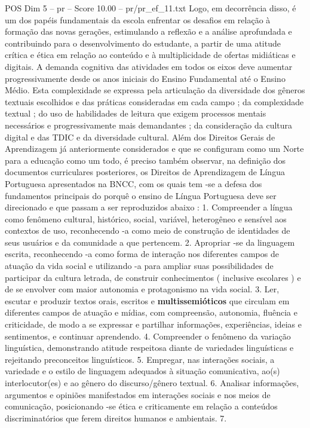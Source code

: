 \begin{textsample}{POS Dim 5 – pr – Score 10.00 – pr/pr\_ef\_11.txt}
Logo, em decorrência disso, é um dos papéis fundamentais da escola enfrentar os desafios em relação à formação das novas gerações, estimulando a reflexão e a análise aprofundada e contribuindo para o desenvolvimento do estudante, a partir de uma atitude crítica e ética em relação ao conteúdo e à multiplicidade de ofertas midiáticas e digitais.
A demanda cognitiva das atividades em todos os eixos deve aumentar progressivamente desde os anos iniciais do Ensino Fundamental até o Ensino Médio.
Esta complexidade se expressa pela articulação da diversidade dos gêneros textuais escolhidos e das práticas consideradas em cada campo ; da complexidade textual ; do uso de habilidades de leitura que exigem processos mentais necessários e progressivamente mais demandantes ; da consideração da cultura digital e das TDIC e da diversidade cultural.
Além dos Direitos Gerais de Aprendizagem já anteriormente considerados e que se configuram como um Norte para a educação como um todo, é preciso também observar, na definição dos documentos curriculares posteriores, os Direitos de Aprendizagem de Língua Portuguesa apresentados na BNCC, com os quais tem -se a defesa dos fundamentos principais do porquê o ensino de Língua Portuguesa deve ser direcionado e que passam a ser reproduzidos abaixo : 1.
Compreender a língua como fenômeno cultural, histórico, social, variável, heterogêneo e sensível aos contextos de uso, reconhecendo -a como meio de construção de identidades de seus usuários e da comunidade a que pertencem. 2.
Apropriar -se da linguagem escrita, reconhecendo -a como forma de interação nos diferentes campos de atuação da vida social e utilizando -a para ampliar suas possibilidades de participar da cultura letrada, de construir conhecimentos ( inclusive escolares ) e de se envolver com maior autonomia e protagonismo na vida social. 3.
Ler, escutar e produzir textos orais, escritos e \textbf{multissemióticos} que circulam em diferentes campos de atuação e mídias, com compreensão, autonomia, fluência e criticidade, de modo a se expressar e partilhar informações, experiências, ideias e sentimentos, e continuar aprendendo. 4.
Compreender o fenômeno da variação linguística, demonstrando atitude respeitosa diante de variedades linguísticas e rejeitando preconceitos linguísticos. 5.
Empregar, nas interações sociais, a variedade e o estilo de linguagem adequados à situação comunicativa, ao(s) interlocutor(es) e ao gênero do discurso/gênero textual. 6.
Analisar informações, argumentos e opiniões manifestados em interações sociais e nos meios de comunicação, posicionando -se ética e criticamente em relação a conteúdos discriminatórios que ferem direitos humanos e ambientais. 7.

\end{textsample}
